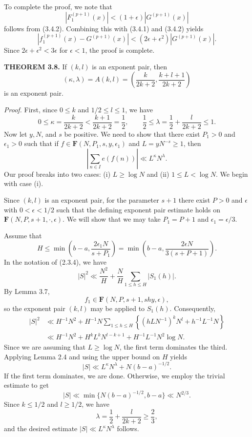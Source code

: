 \documentclass[10pt]{article}
\newcommand{\Fclass}{\mathbf{F}}
\begin{document}
To complete the proof, we note that
\[
 |F_1^{(p+1)}(x)|<(1+\epsilon)|G^{(p+1)}(x)|
\]
follows from (3.4.2). Combining this with (3.4.1) and (3.4.2) yields
\[
 |f_1^{(p+1)}(x)-G^{(p+1)}(x)|
 <(2\epsilon+\epsilon^2)|G^{(p+1)}(x)|.
\]
Since $2\epsilon+\epsilon^2<3\epsilon$ for $\epsilon<1$, the proof is
complete.

\medskip
\noindent\textbf{THEOREM 3.8.}
If $(k,l)$ is an exponent pair, then
\[
 (\kappa,\lambda)=A(k,l)
 =\left(\frac{k}{2k+2},\frac{k+l+1}{2k+2}\right)
\]
is an exponent pair.

\noindent\textit{Proof.}
First, since $0\leq k$ and $1/2\leq l\leq1$, we have
\[
 0\leq\kappa=\frac{k}{2k+2}<\frac{k+1}{2k+2}=\frac12,
 \qquad
 \frac12\leq\lambda=\frac12+\frac{l}{2k+2}\leq1.
\]
Now let $y,N$, and $s$ be positive. We need to show that there exist
$P_1>0$ and $\epsilon_1>0$ such that if
$f\in\Fclass(N,P_1,s,y,\epsilon_1)$ and $L=yN^{-s}\geq1$, then
\[
 \left|\sum_{n\in I}e(f(n))\right|\ll L^\kappa N^\lambda.
\]
Our proof breaks into two cases: (i) $L\geq\log N$ and
(ii) $1\leq L<\log N$. We begin with case (i).

Since $(k,l)$ is an exponent pair, for the parameter $s+1$ there exist
$P>0$ and $\epsilon$ with $0<\epsilon<1/2$ such that the defining exponent
pair estimate holds on $\Fclass(N,P,s+1,\cdot,\epsilon)$. We will show that
we may take $P_1=P+1$ and $\epsilon_1=\epsilon/3$.

Assume that
\[
 H\leq\min\left(b-a,\frac{2\epsilon_1N}{s+P_1}\right)
 =\min\left(b-a,\frac{2\epsilon N}{3(s+P+1)}\right).
\]
In the notation of (2.3.4), we have
\[
 |S|^2\ll\frac{N^2}{H}+\frac NH\sum_{1\leq h\leq H}|S_1(h)|.
\]
By Lemma 3.7,
\[
 f_1\in\Fclass(N,P,s+1,shy,\epsilon),
\]
so the exponent pair $(k,l)$ may be applied to $S_1(h)$. Consequently,
\[
\begin{aligned}
 |S|^2
 &\ll H^{-1}N^2+H^{-1}N\sum_{1\leq h\leq H}
 \left\{(hLN^{-1})^kN^l+h^{-1}L^{-1}N\right\} \\
 &\ll H^{-1}N^2+H^kL^kN^{l-k+1}
      +H^{-1}L^{-1}N^2\log N.
\end{aligned}
\]
Since we are assuming that $L\geq\log N$, the first term dominates the
third. Applying Lemma 2.4 and using the upper bound on $H$ yields
\[
 |S|\ll L^\kappa N^\lambda+N(b-a)^{-1/2}.
\]
If the first term dominates, we are done. Otherwise, we employ the trivial
estimate to get
\[
 |S|\ll\min\{N(b-a)^{-1/2},b-a\}\ll N^{2/3}.
\]
Since $k\leq1/2$ and $l\geq1/2$, we have
\[
 \lambda=\frac12+\frac{l}{2k+2}\geq\frac23,
\]
and the desired estimate $|S|\ll L^\kappa N^\lambda$ follows.
\end{document}
